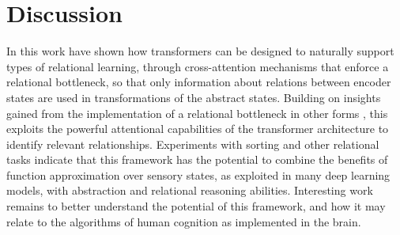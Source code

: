 \section{Discussion}
\label{sec:discuss}



In this work have shown how transformers
can be designed to
%
naturally support types of relational learning, through cross-attention
mechanisms that enforce a relational bottleneck, so that only information about relations between encoder states
are used in transformations of the abstract states.
Building on insights gained from the implementation of a relational bottleneck in other forms \citep{esbn, kerg2022neural}, this exploits the powerful attentional capabilities of the transformer architecture to identify relevant relationships.
Experiments with sorting and other relational tasks indicate that this framework has the potential to combine the benefits of function approximation over sensory states, as exploited in many deep learning models, with abstraction and relational reasoning abilities. Interesting
work remains to better understand the potential of this framework, and
how it may relate to the algorithms of human cognition as implemented in the brain.

